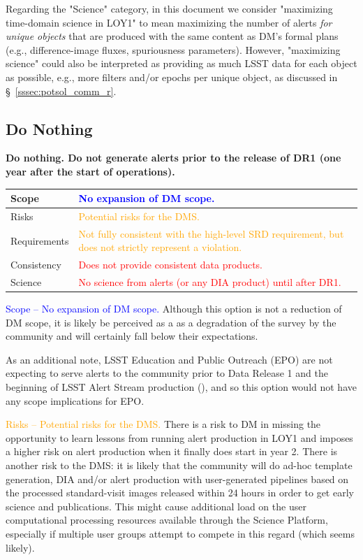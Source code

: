 \documentclass[DM,toc]{lsstdoc}
\begin{document}
Regarding the "Science" category, in this document we consider "maximizing time-domain science in LOY1" to mean maximizing the number of alerts {\em for unique objects} that are produced with the same content as DM's formal plans (e.g., difference-image fluxes, spuriousness parameters).
However, "maximizing science" could also be interpreted as providing as much LSST data for each object as possible, e.g., more filters and/or epochs per unique object, as discussed in \S~\ref{sssec:potsol_comm_r}.

\clearpage
\subsection{Do Nothing}\label{ssec:potsol_donothing}

{\bf Do nothing. Do not generate alerts prior to the release of DR1 (one year after the start of operations).}

\begin{center}
\begin{tabular}{|p{2.5cm}|p{13cm}|}
\hline
Scope & \textcolor{blue}{No expansion of DM scope.} \\
\hline
Risks & \textcolor{orange}{Potential risks for the DMS.} \\
\hline
Requirements & \textcolor{orange}{Not fully consistent with the high-level SRD requirement, but does not strictly represent a violation.} \\
\hline
Consistency & \textcolor{red}{Does not provide consistent data products.} \\
\hline
Science & \textcolor{red}{No science from alerts (or any DIA product) until after DR1.} \\
\hline
\end{tabular}
\end{center}

\textcolor{blue}{ Scope -- No expansion of DM scope.}
Although this option is not a reduction of DM scope, it is likely be perceived as a as a degradation of the survey by the community and will certainly fall below their expectations.

As an additional note, LSST Education and Public Outreach (EPO) are not expecting to serve alerts to the community prior to Data Release 1 and the beginning of LSST Alert Stream production (), and so this option would not have any scope implications for EPO.

\textcolor{orange}{ Risks -- Potential risks for the DMS.}
There is a risk to DM in missing the opportunity to learn lessons from running alert production in LOY1
and imposes a higher risk on alert production when it finally does start in year 2.
There is another risk to the DMS: it is likely that the community will do ad-hoc template generation, DIA and/or alert production with user-generated pipelines based on the processed standard-visit images released within 24 hours in order to get early science and publications.
This might cause additional load on the user computational processing resources available through the Science Platform, especially if multiple user groups attempt to compete in this regard (which seems likely).
\end{document}
